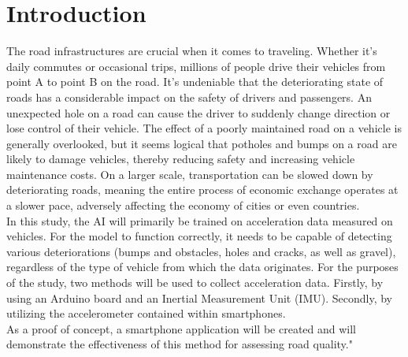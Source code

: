 \section{Introduction}
The road infrastructures are crucial when it comes to traveling. Whether it's daily commutes or occasional trips, millions of people drive their vehicles from point A to point B on the road. It's undeniable that the deteriorating state of roads has a considerable impact on the safety of drivers and passengers. An unexpected hole on a road can cause the driver to suddenly change direction or lose control of their vehicle. The effect of a poorly maintained road on a vehicle is generally overlooked, but it seems logical that potholes and bumps on a road are likely to damage vehicles, thereby reducing safety and increasing vehicle maintenance costs. On a larger scale, transportation can be slowed down by deteriorating roads, meaning the entire process of economic exchange operates at a slower pace, adversely affecting the economy of cities or even countries.\\

In this study, the AI will primarily be trained on acceleration data measured on vehicles. For the model to function correctly, it needs to be capable of detecting various deteriorations (bumps and obstacles, holes and cracks, as well as gravel), regardless of the type of vehicle from which the data originates. For the purposes of the study, two methods will be used to collect acceleration data. Firstly, by using an Arduino board and an Inertial Measurement Unit (IMU). Secondly, by utilizing the accelerometer contained within smartphones.\\

As a proof of concept, a smartphone application will be created and will demonstrate the effectiveness of this method for assessing road quality."